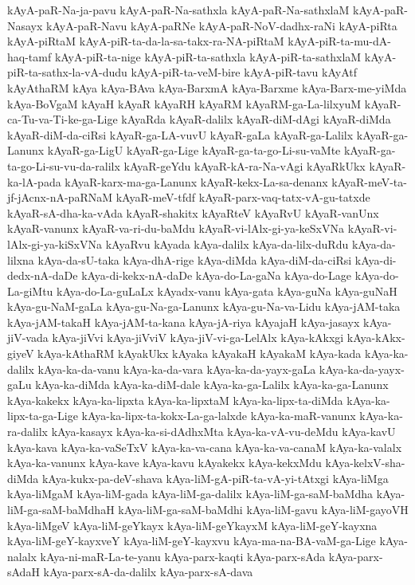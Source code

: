 {kAyA-paR-Na-ja-pavu
kAyA-paR-Na-sathxla
kAyA-paR-Na-sathxlaM
kAyA-paR-Nasayx
kAyA-paR-Navu
kAyA-paRNe
kAyA-paR-NoV-dadhx-raNi
kAyA-piRta
kAyA-piRtaM
kAyA-piR-ta-da-la-sa-takx-ra-NA-piRtaM
kAyA-piR-ta-mu-dA-haq-tamf
kAyA-piR-ta-nige
kAyA-piR-ta-sathxla
kAyA-piR-ta-sathxlaM
kAyA-piR-ta-sathx-la-vA-dudu
kAyA-piR-ta-veM-bire
kAyA-piR-tavu
kAyAtf
kAyAthaRM
kAya
kAya-BAva
kAya-BarxmA
kAya-Barxme
kAya-Barx-me-yiMda
kAya-BoVgaM
kAyaH
kAyaR
kAyaRH
kAyaRM
kAyaRM-ga-La-lilxyuM
kAyaR-ca-Tu-va-Ti-ke-ga-Lige
kAyaRda
kAyaR-dalilx
kAyaR-diM-dAgi
kAyaR-diMda
kAyaR-diM-da-ciRsi
kAyaR-ga-LA-vuvU
kAyaR-gaLa
kAyaR-ga-Lalilx
kAyaR-ga-Lanunx
kAyaR-ga-LigU
kAyaR-ga-Lige
kAyaR-ga-ta-go-Li-su-vaMte
kAyaR-ga-ta-go-Li-su-vu-da-ralilx
kAyaR-geYdu
kAyaR-kA-ra-Na-vAgi
kAyaRkUkx
kAyaR-ka-lA-pada
kAyaR-karx-ma-ga-Lanunx
kAyaR-kekx-La-sa-denanx
kAyaR-meV-ta-jf-jAcnx-nA-paRNaM
kAyaR-meV-tfdf
kAyaR-parx-vaq-tatx-vA-gu-tatxde
kAyaR-sA-dha-ka-vAda
kAyaR-shakitx
kAyaRteV
kAyaRvU
kAyaR-vanUnx
kAyaR-vanunx
kAyaR-va-ri-du-baMdu
kAyaR-vi-lAlx-gi-ya-keSxVNa
kAyaR-vi-lAlx-gi-ya-kiSxVNa
kAyaRvu
kAyada
kAya-dalilx
kAya-da-lilx-duRdu
kAya-da-lilxna
kAya-da-sU-taka
kAya-dhA-rige
kAya-diMda
kAya-diM-da-ciRsi
kAya-di-dedx-nA-daDe
kAya-di-kekx-nA-daDe
kAya-do-La-gaNa
kAya-do-Lage
kAya-do-La-giMtu
kAya-do-La-guLaLx
kAyadx-vanu
kAya-gata
kAya-guNa
kAya-guNaH
kAya-gu-NaM-gaLa
kAya-gu-Na-ga-Lanunx
kAya-gu-Na-va-Lidu
kAya-jAM-taka
kAya-jAM-takaH
kAya-jAM-ta-kana
kAya-jA-riya
kAyajaH
kAya-jasayx
kAya-jiV-vada
kAya-jiVvi
kAya-jiVviV
kAya-jiV-vi-ga-LelAlx
kAya-kAkxgi
kAya-kAkx-giyeV
kAya-kAthaRM
kAyakUkx
kAyaka
kAyakaH
kAyakaM
kAya-kada
kAya-ka-dalilx
kAya-ka-da-vanu
kAya-ka-da-vara
kAya-ka-da-yayx-gaLa
kAya-ka-da-yayx-gaLu
kAya-ka-diMda
kAya-ka-diM-dale
kAya-ka-ga-Lalilx
kAya-ka-ga-Lanunx
kAya-kakekx
kAya-ka-lipxta
kAya-ka-lipxtaM
kAya-ka-lipx-ta-diMda
kAya-ka-lipx-ta-ga-Lige
kAya-ka-lipx-ta-kokx-La-ga-lalxde
kAya-ka-maR-vanunx
kAya-ka-ra-dalilx
kAya-kasayx
kAya-ka-si-dAdhxMta
kAya-ka-vA-vu-deMdu
kAya-kavU
kAya-kava
kAya-ka-vaSeTxV
kAya-ka-va-cana
kAya-ka-va-canaM
kAya-ka-valalx
kAya-ka-vanunx
kAya-kave
kAya-kavu
kAyakekx
kAya-kekxMdu
kAya-kelxV-sha-diMda
kAya-kukx-pa-deV-shava
kAya-liM-gA-piR-ta-vA-yi-tAtxgi
kAya-liMga
kAya-liMgaM
kAya-liM-gada
kAya-liM-ga-dalilx
kAya-liM-ga-saM-baMdha
kAya-liM-ga-saM-baMdhaH
kAya-liM-ga-saM-baMdhi
kAya-liM-gavu
kAya-liM-gayoVH
kAya-liMgeV
kAya-liM-geYkayx
kAya-liM-geYkayxM
kAya-liM-geY-kayxna
kAya-liM-geY-kayxveY
kAya-liM-geY-kayxvu
kAya-ma-na-BA-vaM-ga-Lige
kAya-nalalx
kAya-ni-maR-La-te-yanu
kAya-parx-kaqti
kAya-parx-sAda
kAya-parx-sAdaH
kAya-parx-sA-da-dalilx
kAya-parx-sA-dava
}
